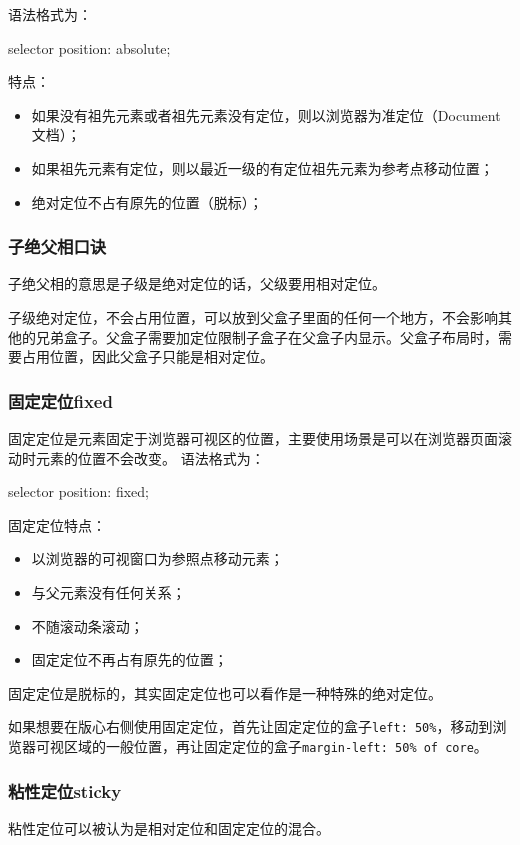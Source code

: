 语法格式为：
\begin{css}
	selector {
	position: absolute;
	}
\end{css}
特点：
\begin{itemize}
	\item 如果没有祖先元素或者祖先元素没有定位，则以浏览器为准定位（Document文档）；
	\item 如果祖先元素有定位，则以最近一级的有定位祖先元素为参考点移动位置；
	\item 绝对定位不占有原先的位置（脱标）；
\end{itemize}

\subsubsection{子绝父相口诀}

子绝父相的意思是子级是绝对定位的话，父级要用相对定位。

子级绝对定位，不会占用位置，可以放到父盒子里面的任何一个地方，不会影响其他的兄弟盒子。父盒子需要加定位限制子盒子在父盒子内显示。父盒子布局时，需要占用位置，因此父盒子只能是相对定位。

\subsubsection{固定定位fixed}
固定定位是元素固定于浏览器可视区的位置，主要使用场景是可以在浏览器页面滚动时元素的位置不会改变。
语法格式为：
\begin{css}
	selector {
	position: fixed;
	}
\end{css}

固定定位特点：
\begin{itemize}
	\item 以浏览器的可视窗口为参照点移动元素；
	\item 与父元素没有任何关系；
	\item 不随滚动条滚动；
	\item 固定定位不再占有原先的位置；
\end{itemize}

固定定位是脱标的，其实固定定位也可以看作是一种特殊的绝对定位。

如果想要在版心右侧使用固定定位，首先让固定定位的盒子\verb|left: 50%|，移动到浏览器可视区域的一般位置，再让固定定位的盒子\verb|margin-left: 50% of core|。

\subsubsection{粘性定位sticky}
粘性定位可以被认为是相对定位和固定定位的混合。

